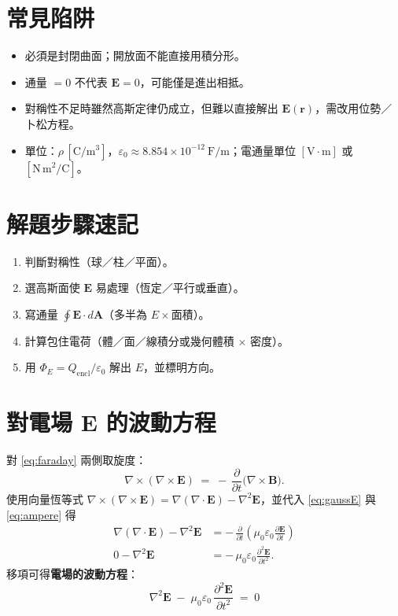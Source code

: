 \documentclass{article}
\begin{document}
\section{常見陷阱}
\begin{itemize}[leftmargin=1.5em]
\item 必須是封閉曲面；開放面不能直接用積分形。
\item 通量 $=0$ 不代表 $\mathbf{E}=0$，可能僅是進出相抵。
\item 對稱性不足時雖然高斯定律仍成立，但難以直接解出 $\mathbf{E}(\mathbf{r})$，需改用位勢／卜松方程。
\item 單位：$\rho\,[\mathrm{C/m^3}]$，$\varepsilon_0\approx 8.854\times 10^{-12}\ \mathrm{F/m}$；電通量單位 $[\mathrm{V\cdot m}]$ 或 $[\mathrm{N\,m^2/C}]$。
\end{itemize}

\section{解題步驟速記}
\begin{enumerate}[leftmargin=1.5em]
\item 判斷對稱性（球／柱／平面）。
\item 選高斯面使 $\mathbf{E}$ 易處理（恆定／平行或垂直）。
\item 寫通量 $\displaystyle \oint \mathbf{E}\cdot d\mathbf{A}$（多半為 $E\times \text{面積}$）。
\item 計算包住電荷（體／面／線積分或幾何體積 $\times$ 密度）。
\item 用 $\Phi_E=Q_{\text{encl}}/\varepsilon_0$ 解出 $E$，並標明方向。
\end{enumerate}
\section*{對電場 $\bm E$ 的波動方程}
對 \eqref{eq:faraday} 兩側取旋度：
\begin{equation}
\nabla \times (\nabla \times \bm E) \;=\; -\,\frac{\partial}{\partial t}\bigl(\nabla \times \bm B\bigr).
\end{equation}
使用向量恆等式 $\nabla \times (\nabla \times \bm E)=\nabla(\nabla\cdot \bm E)-\nabla^2 \bm E$，並代入 \eqref{eq:gaussE} 與 \eqref{eq:ampere} 得
\begin{align}
\nabla(\nabla\cdot \bm E) - \nabla^2 \bm E &= -\,\frac{\partial}{\partial t}\!\left(\mu_0 \varepsilon_0 \frac{\partial \bm E}{\partial t}\right)\\
0 - \nabla^2 \bm E &= -\,\mu_0 \varepsilon_0 \frac{\partial^2 \bm E}{\partial t^2}.
\end{align}
移項可得\textbf{電場的波動方程}：
\begin{equation}
\boxed{\;\nabla^2 \bm E \;-\; \mu_0 \varepsilon_0 \,\frac{\partial^2 \bm E}{\partial t^2} \;=\; 0\; } \label{eq:waveE}
\end{equation}
\end{document}
